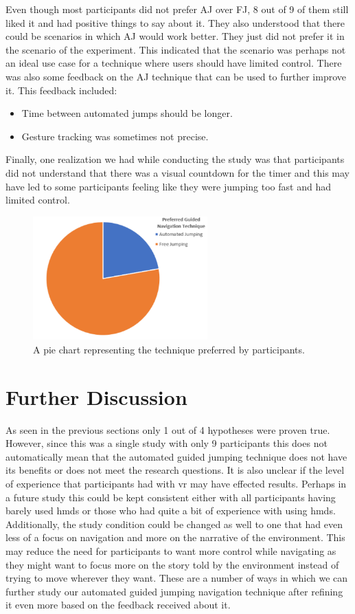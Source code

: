Even though most participants did not prefer AJ over FJ, 8 out of 9 of them still liked it and had positive things to say about it. They also understood that there could be scenarios in which AJ would work better. They just did not prefer it in the scenario of the experiment. This indicated that the scenario was perhaps not an ideal use case for a technique where users should have limited control. There was also some feedback on the AJ technique that can be used to further improve it. This feedback included:
\begin{itemize}
	\item Time between automated jumps should be longer.
	\item Gesture tracking was sometimes not precise.
\end{itemize}

Finally, one realization we had while conducting the study was that participants did not understand that there was a visual countdown for the timer and this may have led to some participants feeling like they were jumping too fast and had limited control.  

\begin{figure}[]
	\centering
	\includegraphics[width=0.6\textwidth]{images/comparison-chart.pdf}
	\caption{A pie chart representing the technique preferred by participants.}
	\label{fig:comparison}
\end{figure}
\section{Further Discussion}
\label{subsection EUS: Further Discussion}
As seen in the previous sections only 1 out of 4 hypotheses were proven true. However, since this was a single study with only 9 participants this does not automatically mean that the automated guided jumping technique does not have its benefits or does not meet the research questions. It is also unclear if the level of experience that participants had with \acrshort{vr} may have effected results. Perhaps in a future study this could be kept consistent either with all participants having barely used \acrshort{hmd}s or those who had quite a bit of experience with using \acrshort{hmd}s. Additionally, the study condition could be changed as well to one that had even less of a focus on navigation and more on the narrative of the environment. This may reduce the need for participants to want more control while navigating as they might want to focus more on the story told by the environment instead of trying to move wherever they want. These are a number of ways in which we can further study our automated guided jumping navigation technique after refining it even more based on the feedback received about it.